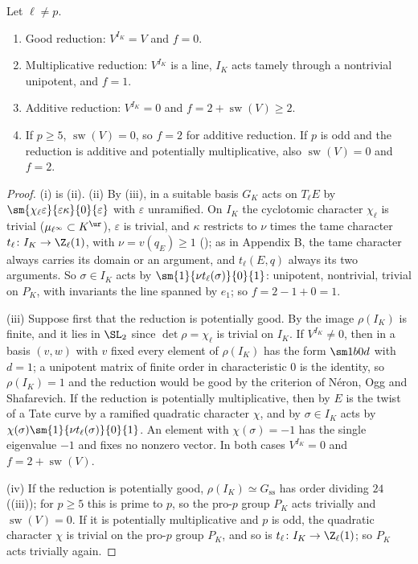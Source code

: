 \begin{proposition}\label{prop:reduction:conductor-values}
Let $\ell\ne p$.
\begin{enumerate}[label=(\roman*)]
\item Good reduction: $V^{I_K}=V$ and $f=0$.
\item Multiplicative reduction: $V^{I_K}$ is a line, $I_K$ acts tamely through a nontrivial unipotent, and $f=1$.
\item Additive reduction: $V^{I_K}=0$ and $f=2+\operatorname{sw}(V)\ge2$.
\item If $p\ge5$, $\operatorname{sw}(V)=0$, so $f=2$ for additive reduction. If $p$ is odd and the reduction is additive
and potentially multiplicative, also $\operatorname{sw}(V)=0$ and $f=2$.
\end{enumerate}
\end{proposition}

\begin{proof}
(i) is (ii). (ii) By (iii), in a suitable basis
$G_K$ acts on $T_\ell E$ by $\sm{\chi_\ell\varepsilon}{\varepsilon\kappa}{0}{\varepsilon}$ with $\varepsilon$ unramified. On $I_K$ the
cyclotomic character $\chi_\ell$ is trivial ($\mu_{\ell^\infty}\subset K^{\ur}$), $\varepsilon$ is trivial, and $\kappa$
restricts to $\nu$ times the tame character $t_\ell\colon I_K\to\Z_\ell(1)$, with $\nu=v(q_E)\ge1$ (); as in
Appendix B, the tame character always carries its domain or an argument, and $t_\ell(E,q)$ always its two arguments. So
$\sigma\in I_K$ acts by $\sm{1}{\nu t_\ell(\sigma)}{0}{1}$: unipotent, nontrivial, trivial on $P_K$, with invariants the line spanned by $e_1$; so
$f=2-1+0=1$.

(iii) Suppose first that the reduction is potentially good. By  the image $\rho(I_K)$ is
finite, and it lies in $\SL_2$ since $\det\rho=\chi_\ell$ is trivial on $I_K$. If $V^{I_K}\ne0$, then in a basis $(v,w)$
with $v$ fixed every element of $\rho(I_K)$ has the form $\sm1b0d$ with $d=1$; a unipotent matrix of finite order in
characteristic $0$ is the identity, so $\rho(I_K)=1$ and the reduction would be good by the criterion of N\'eron, Ogg
and Shafarevich. If the reduction is potentially multiplicative, then by  $E$ is
the twist of a Tate curve by a ramified quadratic character $\chi$, and by 
$\sigma\in I_K$ acts by $\chi(\sigma)\sm{1}{\nu t_\ell(\sigma)}{0}{1}$. An element with $\chi(\sigma)=-1$ has the single eigenvalue
$-1$ and fixes no nonzero vector. In both cases $V^{I_K}=0$ and $f=2+\operatorname{sw}(V)$.

(iv) If the reduction is potentially good, $\rho(I_K)\simeq G_{\mathrm{ss}}$ has order dividing $24$
((iii)); for $p\ge5$ this is prime to $p$, so the pro-$p$ group $P_K$ acts trivially and
$\operatorname{sw}(V)=0$. If it is potentially multiplicative and $p$ is odd, the quadratic character $\chi$ is trivial on the
pro-$p$ group $P_K$, and so is $t_\ell\colon I_K\to\Z_\ell(1)$; so $P_K$ acts trivially again.
\end{proof}

